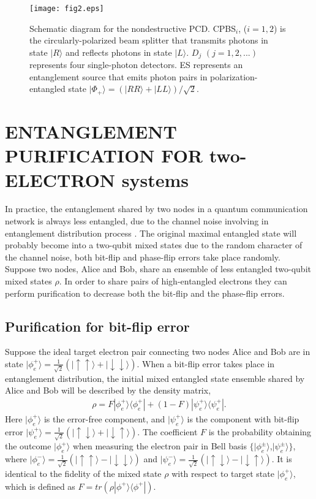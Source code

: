 \documentclass[aps,graphicx,twocolumn]{revtex4}%
\begin{document}
\begin{figure}[!tpb]
  \centering
  \texttt{[image: fig2.eps]}\\
  \caption{Schematic diagram for the nondestructive PCD. CPBS$_i$, ($i=1, 2$)  is the circularly-polarized beam splitter that transmits photons in state $|R\rangle$ and reflects photons in state $|L\rangle$. $D_{j}$ $(j=1, 2,...)$ represents four single-photon detectors. ES represents an entanglement source that emits  photon pairs in polarization-entangled state $|\Phi_+\rangle=(|RR\rangle+|LL\rangle)/\sqrt{2}$. }\label{qnd}
\end{figure}

\section{ENTANGLEMENT PURIFICATION FOR two-ELECTRON  systems}
In practice, the entanglement shared by two nodes in a quantum communication network is always less entangled, due to the channel noise involving in entanglement distribution process \cite{Quaninternet,nielsen2000}. The original maximal entangled state will probably become into a two-qubit mixed states due to the random character of the channel noise, both bit-flip and phase-flip errors take place randomly. Suppose two nodes, Alice and Bob, share an ensemble of less entangled two-qubit mixed states $\rho$. In order to share pairs of high-entangled electrons
they can perform purification to decrease both the bit-flip and the phase-flip errors.


\subsection{Purification for bit-flip error}

Suppose the ideal target electron pair connecting two nodes Alice and Bob are in state $|\phi^+_e\rangle=\frac{1}{\sqrt{2}}(|\uparrow\uparrow\rangle+|\downarrow\downarrow\rangle)$. When a bit-flip error takes place in entanglement distribution, the initial mixed entangled state ensemble shared
by  Alice and Bob will be  described by the density matrix,
\begin{equation}\label{cs}
  \begin{split}
  \rho=F|\phi^+_e\rangle\langle\phi_e^+|+(1-F)|\psi^+_e\rangle\langle\psi_e^+|.
  \end{split}
\end{equation}
Here $|\phi^+_e\rangle$ is the error-free component, and $|\psi^+_e\rangle$ is the component with bit-flip error $|\psi^+_e\rangle=\frac{1}{\sqrt{2}}(|\uparrow\downarrow\rangle+|\downarrow\uparrow\rangle)$. The coefficient $F$ is the probability obtaining the outcome $|\phi^+_e\rangle$  when measuring the electron pair in Bell basis $\{|\phi^{\pm}_e\rangle$,$|\psi^{\pm}_e\rangle\}$, where $|\phi^-_e\rangle=\frac{1}{\sqrt{2}}(|\uparrow\uparrow\rangle-|\downarrow\downarrow\rangle)$ and $|\psi^-_e\rangle=\frac{1}{\sqrt{2}}(|\uparrow\downarrow\rangle-|\downarrow\uparrow\rangle)$. It is identical to the fidelity of the mixed state $\rho$ with respect to target state  $|\phi^+_e\rangle$, which is defined as $F={tr(\rho|\phi^+\rangle\langle\phi^+|)}$.
\end{document}
